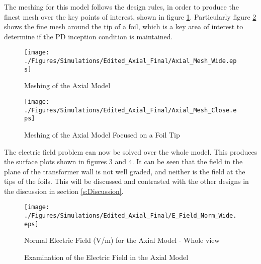 The meshing for this model follows the design rules, in order to produce the finest mesh over the key points of interest, shown in figure \ref{Figure:Axial_Mesh_wide}.
Particularly figure \ref{Figure:Axial_Mesh_close} shows the fine mesh around the tip of a foil, which is a key area of interest to determine if the PD inception condition is maintained.
\begin{figure}[!h]
  \centering
    \texttt{[image: ./Figures/Simulations/Edited\_Axial\_Final/Axial\_Mesh\_Wide.eps]} 
	\caption{Meshing of the Axial Model}
	\label{Figure:Axial_Mesh_wide}
\end{figure}

\begin{figure}[!h]
  \centering
    \texttt{[image: ./Figures/Simulations/Edited\_Axial\_Final/Axial\_Mesh\_Close.eps]} 
	\caption{Meshing of the Axial Model Focused on a Foil Tip}
	\label{Figure:Axial_Mesh_close}
\end{figure}

The electric field problem can now be solved over the whole model.
This produces the surface plots shown in figures \ref{Figure:Radial_Field_Wide} and \ref{Figure:No_Grading_Field}.
It can be seen that the field in the plane of the transformer wall is not well graded, and neither is the field at the tips of the foils.
This will be discussed and contrasted with the other designs in the discussion in section \ref{s:Discussion}.

\begin{figure}[!h]
  \centering
    \texttt{[image: ./Figures/Simulations/Edited\_Axial\_Final/E\_Field\_Norm\_Wide.eps]} 
	\caption{Normal Electric Field (V/m) for the Axial Model - Whole view}
	\label{Figure:Radial_Field_Wide}
   \end{figure}

\begin{figure}[!h]
  \centering
{} 
\caption{Examination of the Electric Field in the Axial Model}
\label{Figure:No_Grading_Field}
\end{figure}


